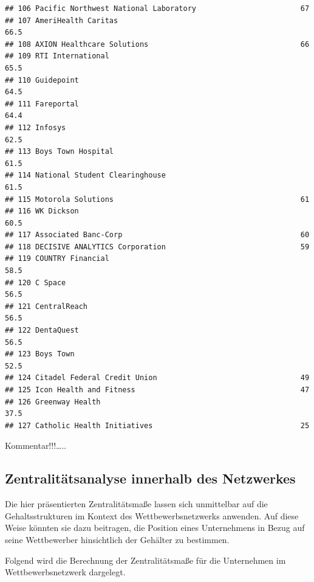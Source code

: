 \documentclass[
]{article}
\begin{document}
\begin{verbatim}
## 106 Pacific Northwest National Laboratory                        67  
## 107 AmeriHealth Caritas                                          66.5
## 108 AXION Healthcare Solutions                                   66  
## 109 RTI International                                            65.5
## 110 Guidepoint                                                   64.5
## 111 Fareportal                                                   64.4
## 112 Infosys                                                      62.5
## 113 Boys Town Hospital                                           61.5
## 114 National Student Clearinghouse                               61.5
## 115 Motorola Solutions                                           61  
## 116 WK Dickson                                                   60.5
## 117 Associated Banc-Corp                                         60  
## 118 DECISIVE ANALYTICS Corporation                               59  
## 119 COUNTRY Financial                                            58.5
## 120 C Space                                                      56.5
## 121 CentralReach                                                 56.5
## 122 DentaQuest                                                   56.5
## 123 Boys Town                                                    52.5
## 124 Citadel Federal Credit Union                                 49  
## 125 Icon Health and Fitness                                      47  
## 126 Greenway Health                                              37.5
## 127 Catholic Health Initiatives                                  25
\end{verbatim}

Kommentar!!!\ldots..

\subsection{Zentralitätsanalyse innerhalb des
Netzwerkes}\label{zentralituxe4tsanalyse-innerhalb-des-netzwerkes}

Die hier präsentierten Zentralitätsmaße lassen sich unmittelbar auf die
Gehaltsstrukturen im Kontext des Wettbewerbsnetzwerks anwenden. Auf
diese Weise könnten sie dazu beitragen, die Position eines Unternehmens
in Bezug auf seine Wettbewerber hinsichtlich der Gehälter zu bestimmen.

Folgend wird die Berechnung der Zentralitätsmaße für die Unternehmen im
Wettbewerbsnetzwerk dargelegt.
\end{document}
